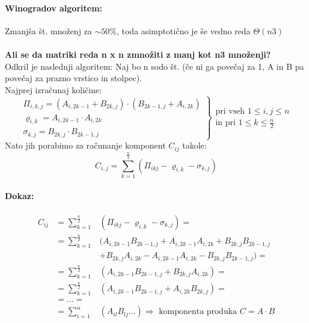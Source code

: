 \documentclass[a4paper,10pt]{article}
\begin{document}
\paragraph{Winogradov algoritem:}
Zmanj\v sa \v st. mno\v zenj za $\sim 50\%$, toda asimptoti\v cno je \v se vedno reda $\Theta(n3)$\\
\\
\textbf{Ali se da matriki reda n x n zmno\v ziti z manj kot n3 mno\v zenji?}\\
Odkril je naslednji algoritem: Naj bo n sodo \v st. (\v ce ni ga pove\v caj za 1, A in B pa pove\v caj za prazno vrstico in stolpec).\\
Najprej izra\v cunaj koli\v cine:\\
$$
\left.
\begin{array}{l}
\Pi_{i,k,j} = (A_{i,2k-1} + B_{2k,j}) \cdot (B_{2k-1,j} + A_{i,2k})\\
\varrho_{i,k} = A_{i,2k-1} \cdot A_{i,2k}\\
\sigma_{k,j} = B_{2k,j} \cdot B_{2k-1,j}
\end{array}
\right\rbrace
\begin{array}{l}
\mbox{pri vseh } 1 \leq i, j \leq n\\
\mbox{in pri } 1 \leq k \leq \frac{n}{2}
\end{array}
$$
Nato jih porabimo za ra\v cunanje komponent $C_{ij}$ takole:
$$
C_{i,j} = \sum_{k=1}^{\frac{n}{2}} (\Pi_{ikj} - \varrho_{i,k} - \sigma_{k,j})
$$

\paragraph{Dokaz:}
$$
\begin{array}{rll}
C_{ij} & = \sum_{k=1}^{\frac{n}{2}} & (\Pi_{ikj} - \varrho_{i,k} - \sigma_{k,j}) =\\
       & = \sum_{k=1}^{\frac{n}{2}} & (A_{i,2k-1}B_{2k-1,j} + A_{i,2k-1}A_{i,2k} + B_{2k,j}B_{2k-1,j}\\
       &                            & + B_{2k,j}A_{i,2k} - A_{i,2k-1}A_{i,2k} - B_{2k,j}B_{2k-1,j}) =\\
       & = \sum_{k=1}^{\frac{n}{2}} & (A_{i,2k-1}B_{2k-1,j} + B_{2k,j}A_{i,2k}) =\\
       & = \sum_{k=1}^{\frac{n}{2}} & (A_{i,2k-1}B_{2k-1,j} + A_{i,2k}B_{2k,j}) =\\
       & = ... =                    & \\
       & = \sum_{i=1}^n             & (A_{il}B_{lj}...) \Rightarrow \mbox{ komponenta produka } C=A\cdot B
\end{array}
$$
\end{document}
